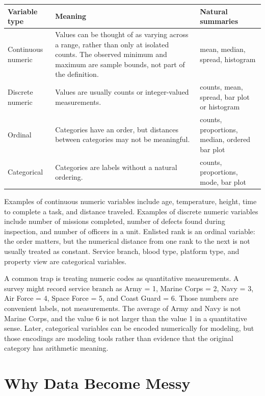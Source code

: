 {\begin{center}
\begin{tabular}{p{}p{}p{}}
\hline
\textbf{Variable type} & \textbf{Meaning} & \textbf{Natural summaries} \\
\hline
Continuous numeric & Values can be thought of as varying across a range, rather than only at isolated counts.  The observed minimum and maximum are sample bounds, not part of the definition. & mean, median, spread, histogram \\
Discrete numeric & Values are usually counts or integer-valued measurements. & counts, mean, spread, bar plot or histogram \\
Ordinal & Categories have an order, but distances between categories may not be meaningful. & counts, proportions, median, ordered bar plot \\
Categorical & Categories are labels without a natural ordering. & counts, proportions, mode, bar plot \\
\hline
\end{tabular}
\end{center}

Examples of continuous numeric variables include age, temperature, height, time to complete a task, and distance traveled.  Examples of discrete numeric variables include number of missions completed, number of defects found during inspection, and number of officers in a unit.  Enlisted rank is an ordinal variable: the order matters, but the numerical distance from one rank to the next is not usually treated as constant.  Service branch, blood type, platform type, and property view are categorical variables.

A common trap is treating numeric codes as quantitative measurements.  A survey might record service branch as Army = 1, Marine Corps = 2, Navy = 3, Air Force = 4, Space Force = 5, and Coast Guard = 6.  Those numbers are convenient labels, not measurements.  The average of Army and Navy is not Marine Corps, and the value 6 is not larger than the value 1 in a quantitative sense.  Later, categorical variables can be encoded numerically for modeling, but those encodings are modeling tools rather than evidence that the original category has arithmetic meaning.

\section{Why Data Become Messy}

}
